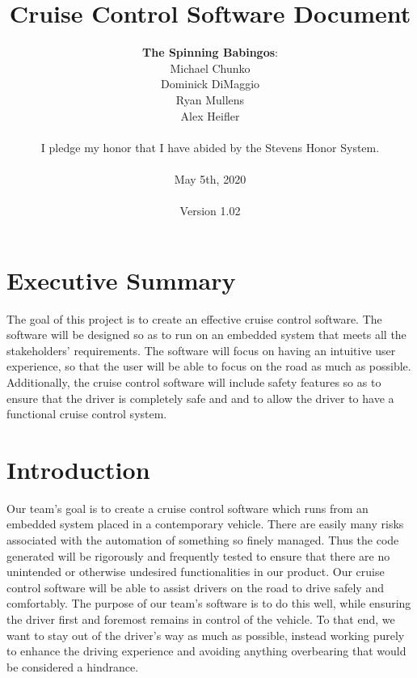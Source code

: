 \documentclass{article}
\title{\textbf{Cruise Control Software Document}}
\author{
	\textbf{The Spinning Babingos}: \\
	Michael Chunko \\
	Dominick DiMaggio \\
	Ryan Mullens \\
	Alex Heifler \\ \\
	I pledge my honor that I have abided by the Stevens Honor System. \\ \\
	May 5th, 2020 \\ \\
	Version 1.02
}
\date{}
\begin{document}
	
	\maketitle
	\newpage
	
	
	\pagestyle{plain}
	
	\tableofcontents
	
	\newpage
	
	\section{Executive Summary}
	\indent\indent The goal of this project is to create an effective cruise control software. The software will be designed so as to run on an embedded system that meets all the stakeholders’ requirements. The software will focus on having an intuitive user experience, so that the user will be able to focus on the road as much as possible. Additionally, the cruise control software will include safety features so as to ensure that the driver is completely safe and and to allow the driver to have a functional cruise control system. 	
	
	\section{Introduction}
	\indent\indent Our team's goal is to create a cruise control software which runs from an embedded system placed in a contemporary vehicle. There are easily many risks associated with the automation of something so finely managed. Thus the code generated will be rigorously and frequently tested to ensure that there are no unintended or otherwise undesired functionalities in our product. Our cruise control software will be able to assist drivers on the road to drive safely and comfortably. The purpose of our team’s software is to do this well, while ensuring the driver first and foremost remains in control of the vehicle. To that end, we want to stay out of the driver’s way as much as possible, instead working purely to enhance the driving experience and avoiding anything overbearing that would be considered a hindrance. \\
	
\end{document}
